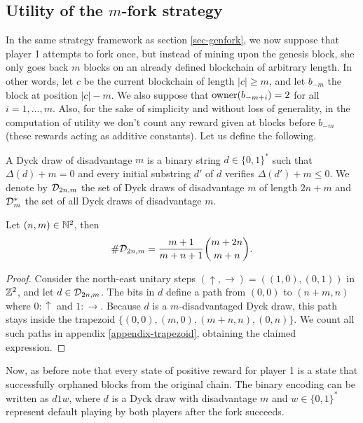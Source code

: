 \subsection{Utility of the $m$-fork strategy}


In the same strategy framework as section \ref{sec-genfork}, we now suppose that player 1 attempts to fork once, but instead of mining upon the genesis block, she only goes back $m$ blocks on an already defined blockchain of arbitrary length. In other words, let $c$ be the current blockchain of length $|c|\geq m$, and let $b_{-m}$ the block at position $|c|-m$. We also suppose that $\text{\rm owner}(b_{-m+i})=2$ for all $i=1,\dots,m$. Also, for the sake of simplicity and without loss of generality, in the computation of utility we don't count any reward given at blocks before $b_{-m}$ (these rewards acting as additive constants). Let us define the following.


\begin{mydef}
	A Dyck draw of disadvantage $m$ is a binary string $d\in\{0,1\}^\ast$ such that $\Delta(d)+m=0$ and every initial substring $d'$ of $d$ verifies $\Delta(d')+m\leq 0$. We denote by $\mathcal{D}_{2n,m}$ the set of Dyck draws of disadvantage $m$ of length $2n+m$ and $\mathcal{D}^\ast_{m}$ the set of all Dyck draws of disadvantage $m$.
\end{mydef}

\begin{myprop*}
	\label{prop-trapezoidcardinality}
	Let $(n,m)\in \mathbb{N}^2$, then 
	$$\#\mathcal{D}_{2n,m}=\frac{m+1}{m+n+1}{m+2n\choose m+n}.$$
\end{myprop*}
\begin{proof}
Consider the north-east unitary steps $(\uparrow,\rightarrow)=((1,0),(0,1))$ in $\mathbb{Z}^2$, and let $d\in \mathcal{D}_{2n,m}$. The bits in $d$ define a path from $(0,0)$ to $(n+m,n)$ where $0:\uparrow$ and $1:\rightarrow$. Because $d$ is a $m$-disadvantaged Dyck draw, this path stays inside the trapezoid $\{(0,0),(m,0),(m+n,n),(0,n)\}$. We count all such paths in appendix \ref{appendix-trapezoid}, obtaining the claimed expression.
\end{proof}
Now, as before note that every state of positive reward for player 1 is a state that successfully orphaned blocks from the original chain. The binary encoding can be written as $d1w$, where $d$ is a Dyck draw with disadvantage $m$ and $w\in\{0,1\}^\ast$ represent default playing by both players after the fork succeeds. 

